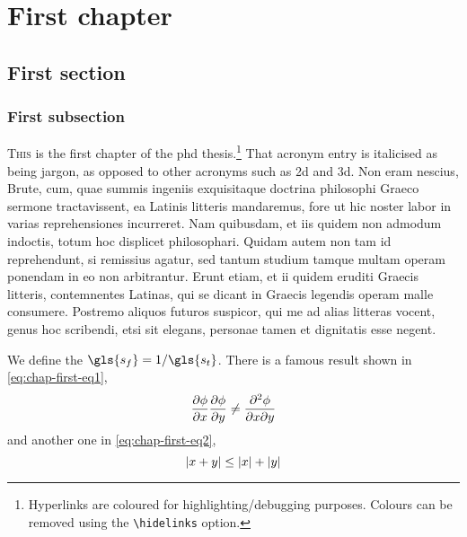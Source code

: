 \clearpage{}

\pagestyle{body}

\chapter{First chapter}
\label{chap:first}



\section{First section}
\label{sec:chap-first-first}

\subsection{First subsection}
\label{subsec:chap-first-first}

\lettrine{T}{his} is the first chapter of the \gls{phd} thesis.\footnote{Hyperlinks are coloured for highlighting/debugging purposes. Colours can be removed using the \texttt{\textbackslash{hidelinks}} option.}
That acronym entry is italicised as being jargon, as opposed to other acronyms such as \gls{2d} and \gls{3d}.
Non eram nescius, Brute, cum, quae summis ingeniis exquisitaque doctrina philosophi Graeco sermone tractavissent, ea Latinis litteris mandaremus, fore ut hic noster labor in varias reprehensiones incurreret.
Nam quibusdam, et iis quidem non admodum indoctis, totum hoc displicet philosophari.
Quidam autem non tam id reprehendunt, si remissius agatur, sed tantum studium tamque multam operam ponendam in eo non arbitrantur.
Erunt etiam, et ii quidem eruditi Graecis litteris, contemnentes Latinas, qui se dicant in Graecis legendis operam malle consumere.
Postremo aliquos futuros suspicor, qui me ad alias litteras vocent, genus hoc scribendi, etsi
sit elegans, personae tamen et dignitatis esse negent.

We define the  \(\gls{s_f} = 1/\gls{s_t}\).
There is a famous result shown in \cref{eq:chap-first-eq1},
\begin{equation}
  \frac{\partial \phi}{\partial x}\frac{\partial \phi}{\partial y} \neq \frac{\partial^{2} \phi}{\partial x\partial y}
  \label{eq:chap-first-eq1}
\end{equation}
and another one in \cref{eq:chap-first-eq2},
\begin{equation}
  \lvert x + y\rvert \leq \lvert x\rvert + \lvert y\rvert
  \label{eq:chap-first-eq2}
\end{equation}

